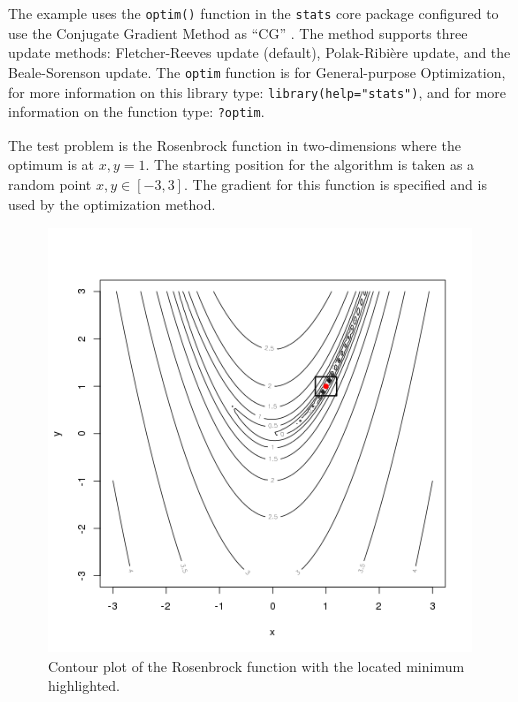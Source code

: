 The example uses the \texttt{optim()} function in the \texttt{stats} core package configured to use the Conjugate Gradient Method as ``CG'' \cite{RDCT2011a}. The method supports three update methods: Fletcher-Reeves update (default), Polak-Ribi\`ere update, and the Beale-Sorenson update. The \texttt{optim} function is for General-purpose Optimization, for more information on this library type: \texttt{library(help="stats")}, and for more information on the function type: \texttt{?optim}.

The test problem is the Rosenbrock function in two-dimensions where the optimum is at $x,y=1$. The starting position for the algorithm is taken as a random point $x,y \in [-3,3]$. The gradient for this function is specified and is used by the optimization method.



\begin{figure}[htp]
\centering
\includegraphics[scale=0.45]{book/a_optimization/conjugate_gradient_result.png}
\caption{Contour plot of the Rosenbrock function with the located minimum highlighted.}
\label{plot:conjugate_gradient_result}
\end{figure}

